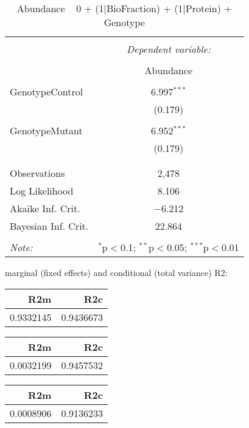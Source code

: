 \documentclass[11pt]{report}
\begin{document}
\begin{table}[!htbp] \centering 
  \caption{Abundance ~ 0 + (1|BioFraction) + (1|Protein) + Genotype} 
  \label{} 
\begin{tabular}{@{\extracolsep{5pt}}lc} 
\\[-1.8ex]\hline 
\hline \\[-1.8ex] 
 & \multicolumn{1}{c}{\textit{Dependent variable:}} \\ 
\cline{2-2} 
\\[-1.8ex] & Abundance \\ 
\hline \\[-1.8ex] 
 GenotypeControl & 6.997$^{***}$ \\ 
  & (0.179) \\ 
  & \\ 
 GenotypeMutant & 6.952$^{***}$ \\ 
  & (0.179) \\ 
  & \\ 
\hline \\[-1.8ex] 
Observations & 2,478 \\ 
Log Likelihood & 8.106 \\ 
Akaike Inf. Crit. & $-$6.212 \\ 
Bayesian Inf. Crit. & 22.864 \\ 
\hline 
\hline \\[-1.8ex] 
\textit{Note:}  & \multicolumn{1}{r}{$^{*}$p$<$0.1; $^{**}$p$<$0.05; $^{***}$p$<$0.01} \\ 
\end{tabular} 
\end{table} 
marginal (fixed effects) and conditional (total variance) R2:

\begin{tabular}{r|r}
\hline
R2m & R2c\\
\hline
0.9332145 & 0.9436673\\
\hline
\end{tabular}

\begin{tabular}{r|r}
\hline
R2m & R2c\\
\hline
0.0032199 & 0.9457532\\
\hline
\end{tabular}

\begin{tabular}{r|r}
\hline
R2m & R2c\\
\hline
0.0008906 & 0.9136233\\
\hline
\end{tabular}
\end{document}
